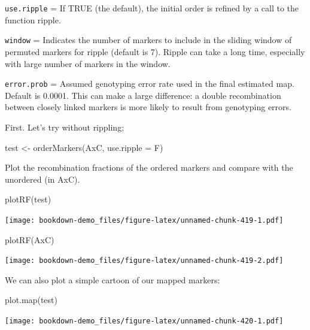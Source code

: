 \documentclass[
]{book}
\newenvironment{Shaded}{\begin{snugshade}}{\end{snugshade}}
\newcommand{\AttributeTok}[1]{\textcolor[rgb]{0.77,0.63,0.00}{#1}}
\newcommand{\FunctionTok}[1]{\textcolor[rgb]{0.00,0.00,0.00}{#1}}
\newcommand{\NormalTok}[1]{#1}
\newcommand{\OtherTok}[1]{\textcolor[rgb]{0.56,0.35,0.01}{#1}}
\begin{document}
\texttt{use.ripple} = If TRUE (the default), the initial order is refined by a call to the function ripple.

\texttt{window} = Indicates the number of markers to include in the sliding window of permuted markers for ripple (default is 7). Ripple can take a long time, especially with large number of markers in the window.

\texttt{error.prob} = Assumed genotyping error rate used in the final estimated map. Default is 0.0001. This can make a large difference: a double recombination between closely linked markers is more likely to result from genotyping errors.

First. Let's try without rippling;

\begin{Shaded}
\begin{Highlighting}[]
\NormalTok{test }\OtherTok{\textless{}{-}} \FunctionTok{orderMarkers}\NormalTok{(AxC, }\AttributeTok{use.ripple =}\NormalTok{ F)}
\end{Highlighting}
\end{Shaded}

Plot the recombination fractions of the ordered markers and compare with the unordered (in AxC).

\begin{Shaded}
\begin{Highlighting}[]
\FunctionTok{plotRF}\NormalTok{(test)}
\end{Highlighting}
\end{Shaded}

\texttt{[image: bookdown-demo\_files/figure-latex/unnamed-chunk-419-1.pdf]}

\begin{Shaded}
\begin{Highlighting}[]
\FunctionTok{plotRF}\NormalTok{(AxC)}
\end{Highlighting}
\end{Shaded}

\texttt{[image: bookdown-demo\_files/figure-latex/unnamed-chunk-419-2.pdf]}

We can also plot a simple cartoon of our mapped markers:

\begin{Shaded}
\begin{Highlighting}[]
\FunctionTok{plot.map}\NormalTok{(test)}
\end{Highlighting}
\end{Shaded}

\texttt{[image: bookdown-demo\_files/figure-latex/unnamed-chunk-420-1.pdf]}
\end{document}
